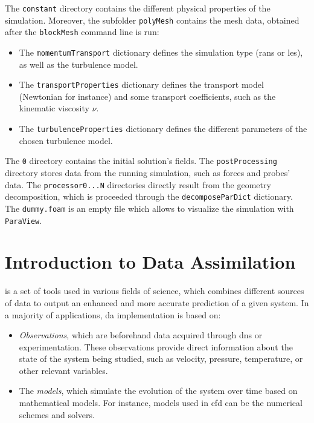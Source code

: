 \documentclass[12pt,twoside]{report}
\begin{document}
The \texttt{constant} directory contains the different physical properties of the simulation. Moreover, the subfolder \texttt{polyMesh} contains the mesh data, obtained after the \texttt{blockMesh} command line is run:
\begin{itemize}
    \item[$-$] The \texttt{momentumTransport} dictionary defines the simulation type (\gls{rans} or \gls{les}), as well as the turbulence model.
    \item[$-$] The \texttt{transportProperties} dictionary defines the transport model (Newtonian for instance) and some transport coefficients, such as the kinematic viscosity $\nu$. 
    \item[$-$] The \texttt{turbulenceProperties} dictionary defines the different parameters of the chosen turbulence model.
\end{itemize}

The \texttt{0} directory contains the initial solution's fields. The \texttt{postProcessing} directory stores data from the running simulation, such as forces and probes' data. The \texttt{processor0...N} directories directly result from the geometry decomposition, which is proceeded through the \texttt{decomposeParDict} dictionary. The \texttt{dummy.foam} is an empty file which allows to visualize the simulation with \texttt{ParaView}. 

\section{Introduction to Data Assimilation}
 \citep{bocquet_data_2016} is a set of tools used in various fields of science, which combines different sources of data to output an enhanced and more accurate prediction of a given system. In a majority of applications, \gls{da} implementation is based on:
\begin{itemize}
    \item[$-$] \textsl{Observations}, which are beforehand data acquired through \gls{dns} or experimentation. These observations provide direct information about the state of the system being studied, such as velocity, pressure, temperature, or other relevant variables.
    \item[$-$] The \textsl{models}, which simulate the evolution of the system over time based on mathematical models. For instance, models used in \gls{cfd} can be the numerical schemes and solvers.
\end{itemize}
\end{document}
